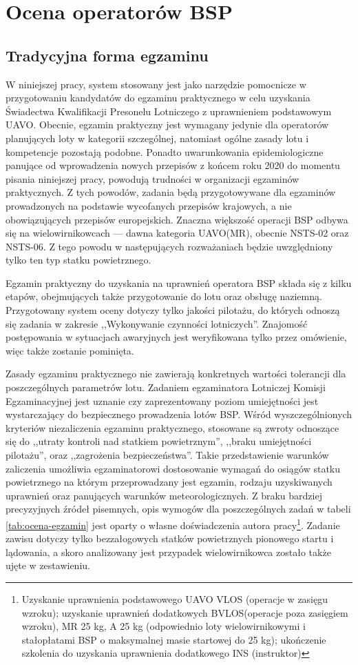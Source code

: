 \newpage
\section{Ocena operatorów BSP}

\subsection{Tradycyjna forma egzaminu}
W niniejszej pracy, system stosowany jest jako narzędzie pomocnicze w przygotowaniu kandydatów do egzaminu praktycznego w celu uzyskania Świadectwa Kwalifikacji Presonelu Lotniczego z uprawnieniem podstawowym UAVO. Obecnie, egzamin praktyczny jest wymagany jedynie dla operatorów planujących loty w kategorii szczególnej\cite{ulc2019}, natomiast ogólne zasady lotu i kompetencje pozostają podobne. Ponadto uwarunkowania epidemiologiczne panujące od wprowadzenia nowych przepisów z końcem roku 2020 do momentu pisania niniejszej pracy, powodują trudności w organizacji egzaminów praktycznych. Z tych powodów, zadania będą przygotowywane dla egzaminów prowadzonych na podstawie wycofanych przepisów krajowych, a nie obowiązujących przepisów europejskich. Znaczna większość operacji BSP odbywa się na wielowirnikowcach --- dawna kategoria UAVO(MR), obecnie NSTS-02 oraz NSTS-06. Z tego powodu w następujących rozważaniach będzie uwzględniony tylko ten typ statku powietrznego.

Egzamin praktyczny do uzyskania na uprawnień operatora BSP składa się z kilku etapów, obejmujących także przygotowanie do lotu oraz obsługę naziemną\cite{ulc2014}. Przygotowany system oceny dotyczy tylko jakości pilotażu, do których odnoszą się zadania w zakresie ,,Wykonywanie czynności lotniczych''. Znajomość postępowania w sytuacjach awaryjnych jest weryfikowana tylko przez omówienie, więc także zostanie pominięta.

Zasady egzaminu praktycznego nie zawierają konkretnych wartości tolerancji dla poszczególnych parametrów lotu. Zadaniem egzaminatora Lotniczej Komisji Egzaminacyjnej jest uznanie czy zaprezentowany poziom umiejętności jest wystarczający do bezpiecznego prowadzenia lotów BSP. Wśród wyszczególnionych kryteriów niezaliczenia egzaminu praktycznego, stosowane są zwroty odnoszące się do ,,utraty kontroli nad statkiem powietrznym'', ,,braku umiejętności pilotażu'', oraz ,,zagrożenia bezpieczeństwa''. Takie przedstawienie warunków zaliczenia umożliwia egzaminatorowi dostosowanie wymagań do osiągów statku powietrznego na którym przeprowadzany jest egzamin, rodzaju uzyskiwanych uprawnień oraz panujących warunków meteorologicznych. Z braku bardziej precyzyjnych źródeł pisemnych, opis wymogów dla poszczególnych zadań w tabeli \ref{tab:ocena-egzamin} jest oparty o własne doświadczenia autora pracy\footnote{Uzyskanie uprawnienia podstawowego UAVO VLOS (operacje w zasięgu wzroku); uzyskanie uprawnień dodatkowych BVLOS(operacje poza zasięgiem wzroku), MR 25 kg, A 25 kg (odpowiednio loty wielowirnikowymi i stałopłatami BSP o maksymalnej masie startowej do 25 kg); ukończenie szkolenia do uzyskania uprawnienia dodatkowego INS (instruktor)}. Zadanie zawisu dotyczy tylko bezzałogowych statków powietrznych pionowego startu i lądowania, a skoro analizowany jest przypadek wielowirnikowca zostało także ujęte w zestawieniu.

